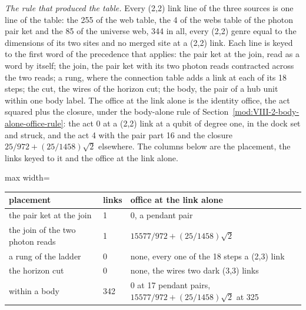 \begin{chproof}
\textit{The rule that produced the table.} Every (2,2) link line of the three sources is one line of the table: the 255 of the web table, the 4 of the webs table of the photon pair ket and the 85 of the universe web, 344 in all, every (2,2) genre equal to the dimensions of its two sites and no merged site at a (2,2) link. Each line is keyed to the first word of the precedence that applies: the pair ket at the join, read as a word by itself; the join, the pair ket with its two photon reads contracted across the two reads; a rung, where the connection table adds a link at each of its 18 steps; the cut, the wires of the horizon cut; the body, the pair of a hub unit within one body label. The office at the link alone is the identity office, the act squared plus the closure, under the body-alone rule of Section~\ref{mod:VIII-2-body-alone-office-rule}: the act 0 at a (2,2) link at a qubit of degree one, in the dock set and struck, and the act 4 with the pair part 16 and the closure $25/972 + (25/1458)\sqrt{2}$ elsewhere. The columns below are the placement, the links keyed to it and the office at the link alone.

\begin{center}
\begin{adjustbox}{max width=\linewidth}\begin{tabular}{lll}
\hline
placement & links & office at the link alone \\
\hline
the pair ket at the join & 1 & 0, a pendant pair \\
the join of the two photon reads & 1 & $15577/972 + (25/1458)\sqrt{2}$ \\
a rung of the ladder & 0 & none, every one of the 18 steps a (2,3) link \\
the horizon cut & 0 & none, the wires two dark (3,3) links \\
within a body & 342 & 0 at 17 pendant pairs, $15577/972 + (25/1458)\sqrt{2}$ at 325 \\
\hline
\end{tabular}\end{adjustbox}
\end{center}


\end{chproof}
